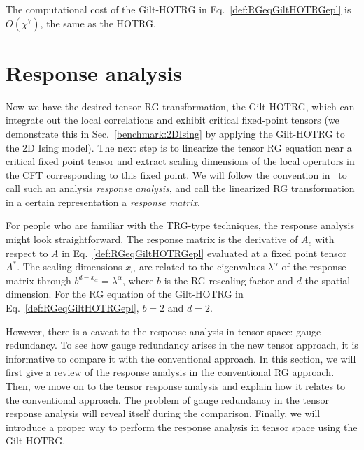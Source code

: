 \documentclass[aps,prb,reprint,superscriptaddress]{revtex4-2}
\begin{document}
The computational cost of the Gilt-HOTRG in
Eq.~\eqref{def:RGeqGiltHOTRGepl} is $O(\chi^7)$, the same as the HOTRG.

\section{Response analysis\label{diffRGeq}}
Now we have the desired tensor RG transformation, the Gilt-HOTRG, which
can integrate out the local correlations and exhibit critical
fixed-point tensors (we demonstrate this in Sec.~\ref{benchmark:2DIsing}
by applying the Gilt-HOTRG to the 2D Ising model). The next step is to
linearize the tensor RG equation near a critical fixed point tensor and
extract scaling dimensions of the local operators in the CFT
corresponding to this fixed point. We will follow the convention
in~\cite{kadanoff2014} to call such an analysis \textit{response
analysis}, and call the linearized RG transformation in a certain
representation a \textit{response matrix}.
%

For people who are familiar with the TRG-type techniques, the response
analysis might look straightforward. The response matrix is the
derivative of $A_c$ with respect to $A$ in
Eq.~\eqref{def:RGeqGiltHOTRGepl} evaluated at a fixed point tensor
$A^{*}$. The scaling dimensions $x_{\alpha}$ are related to the eigenvalues
$\lambda^{\alpha}$ of the response matrix through $b^{d-x_{\alpha}} =
\lambda^{\alpha}$, where $b$ is the RG rescaling factor and $d$ the
spatial dimension. For the RG equation of the Gilt-HOTRG in
Eq.~\eqref{def:RGeqGiltHOTRGepl}, $b = 2$ and $d = 2$. 
%

However, there is a caveat to the response analysis in tensor space: gauge
redundancy. To see how gauge redundancy arises in the new tensor
approach, it is informative to compare it with the conventional
approach. In this section, we will first give a review of the response
analysis in the conventional RG approach. Then, we move on to the tensor
response analysis and explain how it relates to the conventional
approach. The problem of gauge redundancy in the tensor response analysis will
reveal itself during the comparison. Finally, we will introduce a
proper way to perform the response analysis in tensor space using
the Gilt-HOTRG.
%
\end{document}
